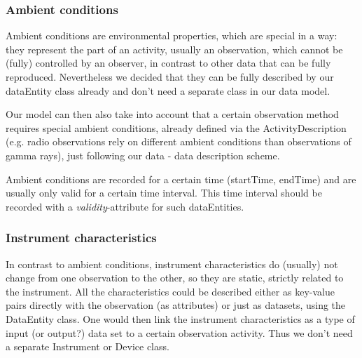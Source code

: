 \subsubsection{Ambient conditions}
Ambient conditions are environmental properties, which are special in a way: 
they represent the part of an activity, usually an observation, which cannot be 
(fully) controlled by an
observer, in contrast to other data that can be fully reproduced.
Nevertheless we decided that they can be fully described by our 
dataEntity class already and don't need a separate class in our data model. 

Our model can then also take into account that a certain observation
method requires special ambient conditions, already defined via the 
ActivityDescription (e.g. radio observations rely on different ambient 
conditions than observations
of gamma rays), just following our data - data description scheme.


Ambient conditions are recorded for a certain time (startTime, endTime) and are
usually only valid for a certain time interval. This time interval should be recorded
with a \emph{validity}-attribute for such dataEntities.





\subsubsection{Instrument characteristics}
In contrast to ambient conditions, instrument characteristics do (usually) not
change from one observation to the other, so they are static, strictly related to
the instrument. 
All the characteristics could be described either as key-value pairs directly with the 
observation (as attributes) or just as datasets, using the DataEntity class. 
One would then 
link the instrument characteristics as a type of input (or output?) data set to a certain 
observation activity. Thus we don't need a separate Instrument or Device class.



